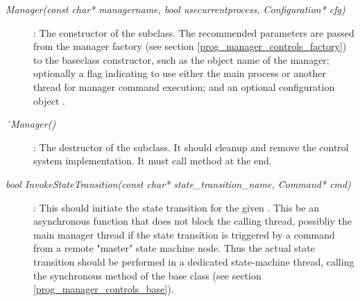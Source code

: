 \begin{description}

\item[\em Manager(const char* managername,  bool usecurrentprocess, Configuration* cfg)] :
The constructor of the subclass. The recommended parameters 
are passed from the manager factory (see section \ref{prog_manager_controls_factory})
to the baseclass constructor, such as
the object name of the manager; optionally a
flag indicating to use either the main process or another thread for manager 
command execution;
and an optional configuration object .


     
\item[\em\~{~}Manager()] :
The destructor of the subclass. It should cleanup and remove the  
control system implementation. It must call method 
at the end.    


\item[\em bool InvokeStateTransition(const char* state\_transition\_name, 
Command* cmd)] : 
This should initiate the state transition for the given .
This  be an asynchronous function that does not block the calling thread,
possibliy the main manager thread if the state transition is triggered by a command
from a remote "master" state machine node. Thus the actual state transition should be performed in a dedicated state-machine thread, calling the synchronous method
 of the base class (see section \ref{prog_manager_controls_base}).


\end{description}
